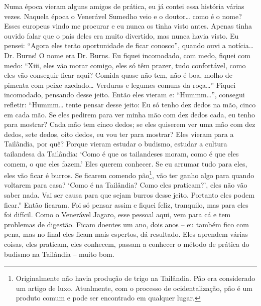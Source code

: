 Numa época vieram alguns amigos de prática, eu já contei essa
história várias vezes. Naquela época o Venerável Sumedho veio e o
doutor… como é o nome? Esses europeus vindo me procurar e eu nunca os
tinha visto antes. Apenas tinha ouvido falar que o país deles era muito
divertido, mas nunca havia visto. Eu pensei: “Agora eles terão
oportunidade de ficar conosco”, quando ouvi a notícia… Dr. Burns! O
nome era Dr. Burns. Eu fiquei incomodado, com medo, fiquei com medo:
“Xiii, eles vão morar comigo, eles só têm prazer, tudo confortável,
como eles vão conseguir ficar aqui? Comida quase não tem, não é boa,
molho de pimenta com peixe azedado… Verduras e legumes comuns da roça…”
Fiquei incomodado, pensando desse jeito. Então eles vieram e: “Hummm…”,
consegui refletir: “Hummm… tente pensar desse jeito: Eu só tenho dez
dedos na mão, cinco em cada mão. Se eles pedirem para ver minha mão com
dez dedos cada, eu tenho para mostrar? Cada mão tem cinco dedos; se
eles quiserem ver uma mão com dez dedos, sete dedos, oito dedos, eu vou
ter para mostrar? Eles vieram para a Tailândia, por quê? Porque vieram
estudar o budismo, estudar a cultura tailandesa da Tailândia: ‘Como é
que os tailandeses moram, como é que eles comem, o que eles fazem.’
Eles querem conhecer. Se eu arrumar tudo para eles, eles vão ficar é
burros. Se ficarem comendo pão\footnote{Originalmente não havia
produção de trigo na Tailândia. Pão era considerado um artigo de luxo.
Atualmente, com o processo de ocidentalização, pão é um produto comum e
pode ser encontrado em qualquer lugar.}, vão ter ganho algo para quando
voltarem para casa? ‘Como é na Tailândia? Como eles praticam?’, eles
não vão saber nada. Vai ser causa para que sejam burros desse jeito.
Portanto eles podem ficar.” Então ficaram. Foi só pensar assim e fiquei
feliz, tranquilo, mas para eles foi difícil. Como o Venerável Jagaro,
esse pessoal aqui, vem para cá e tem problemas de digestão. Ficam
doentes um ano, dois anos – eu também fico com pena, mas no final eles
ficam mais espertos, dá resultado. Eles aprendem várias coisas, eles
praticam, eles conhecem, passam a conhecer o método de prática do
budismo na Tailândia – muito bom. 

